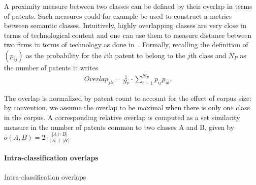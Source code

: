 A proximity measure between two classes can be defined by their overlap in terms of patents. 
Such measures could for example be used to construct a metrics between semantic classes. Intuitively, highly overlapping classes are very close in terms of technological content and one can use them to measure distance between two firms in terms of technology as done in~\cite{Bloom2005distance}. Formally, recalling the definition of $\left(p_{ij}\right)$ as the probability for the $i$th patent to belong to the $j$th class and $N_P$ as the number of patents it writes 
\begin{eqnarray}
\label{overlap}
Overlap_{jk} = \frac{1}{N_P}\cdot \sum_{i=1}^{N_P} p_{ij} p_{ik}. 
\end{eqnarray}

The overlap is normalized by patent count to account for the effect of corpus size: by convention, we assume the overlap to be maximal when there is only one class in the corpus. A corresponding relative overlap is computed as a set similarity measure in the number of patents common to two classes A and B, given by $o(A,B)=2\cdot \frac{\left|A\cap B\right|}{\left|A\right| + \left|B\right|}$.


\paragraph{Intra-classification overlaps}{Intra-classification overlaps}

